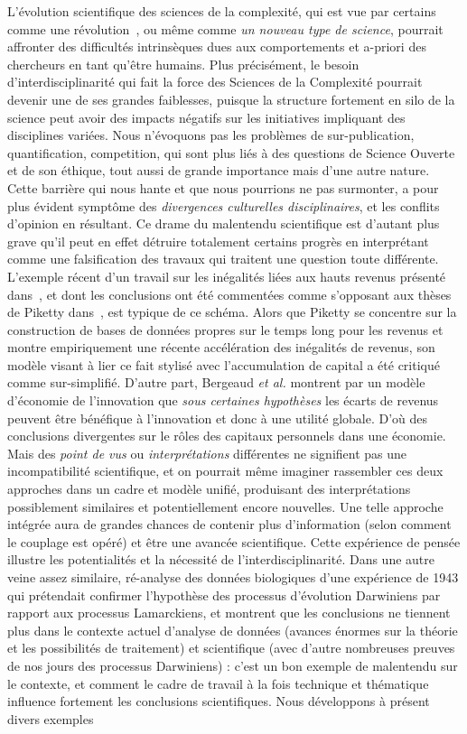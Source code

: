 {}{
L'évolution scientifique des sciences de la complexité, qui est vue par certains comme une révolution~\cite{colander2003complexity}, ou même comme \emph{un nouveau type de science}, pourrait affronter des difficultés intrinsèques dues aux comportements et a-priori des chercheurs en tant qu'être humains. Plus précisément, le besoin d'interdisciplinarité qui fait la force des Sciences de la Complexité pourrait devenir une de ses grandes faiblesses, puisque la structure fortement en silo de la science peut avoir des impacts négatifs sur les initiatives impliquant des disciplines variées. Nous n'évoquons pas les problèmes de sur-publication, quantification, competition, qui sont plus liés à des questions de Science Ouverte et de son éthique, tout aussi de grande importance mais d'une autre nature. Cette barrière qui nous hante et que nous pourrions ne pas surmonter, a pour plus évident symptôme des \emph{divergences culturelles disciplinaires}, et les conflits d'opinion en résultant. Ce drame du malentendu scientifique est d'autant plus grave qu'il peut en effet détruire totalement certains progrès en interprétant comme une falsification des travaux qui traitent une question toute différente. L'exemple récent d'un travail sur les inégalités liées aux hauts revenus présenté dans~\cite{aghion2015innovation}, et dont les conclusions ont été commentées comme s'opposant aux thèses de Piketty dans~\cite{piketty2013capital}, est typique de ce schéma. Alors que Piketty se concentre sur la construction de bases de données propres sur le temps long pour les revenus et montre empiriquement une récente accélération des inégalités de revenus, son modèle visant à lier ce fait stylisé avec l'accumulation de capital a été critiqué comme sur-simplifié. D'autre part, Bergeaud \textit{et al.} montrent par un modèle d'économie de l'innovation que \emph{sous certaines hypothèses} les écarts de revenus peuvent être bénéfique à l'innovation et donc à une utilité globale. D'où des conclusions divergentes sur le rôles des capitaux personnels dans une économie. Mais des \emph{point de vus} ou \emph{interprétations} différentes ne signifient pas une incompatibilité scientifique, et on pourrait même imaginer rassembler ces deux approches dans un cadre et modèle unifié, produisant des interprétations possiblement similaires et potentiellement encore nouvelles. Une telle approche intégrée aura de grandes chances de contenir plus d'information (selon comment le couplage est opéré) et être une avancée scientifique. Cette expérience de pensée illustre les potentialités et la nécessité de l'interdisciplinarité. Dans une autre veine assez similaire, \cite{2017arXiv170105627H} ré-analyse des données biologiques d'une expérience de 1943 qui prétendait confirmer l'hypothèse des processus d'évolution Darwiniens par rapport aux processus Lamarckiens, et montrent que les conclusions ne tiennent plus dans le contexte actuel d'analyse de données (avances énormes sur la théorie et les possibilités de traitement) et scientifique (avec d'autre nombreuses preuves de nos jours des processus Darwiniens) : c'est un bon exemple de malentendu sur le contexte, et comment le cadre de travail à la fois technique et thématique influence fortement les conclusions scientifiques. Nous développons à présent divers exemples }
